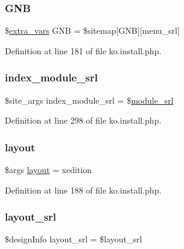 \subsubsection{\texorpdfstring{G\+NB}{GNB}}
{\footnotesize\ttfamily \$\hyperlink{ko_8install_8php_ae1dcb37fc34a8f312d2e6abd6f806743}{extra\+\_\+vars} G\+NB = \$sitemap\mbox{[}\textquotesingle{}G\+NB\textquotesingle{}\mbox{]}\mbox{[}\textquotesingle{}menu\+\_\+srl\textquotesingle{}\mbox{]}}



Definition at line 181 of file ko.\+install.\+php.

\hypertarget{ko_8install_8php_acd0b17bfe6d14c82871d73fa39c9c22d}{}\label{ko_8install_8php_acd0b17bfe6d14c82871d73fa39c9c22d} 
\subsubsection{\texorpdfstring{index\+\_\+module\+\_\+srl}{index\_module\_srl}}
{\footnotesize\ttfamily \$site\+\_\+args index\+\_\+module\+\_\+srl = \$\hyperlink{ko_8install_8php_a370bb6450fab1da3e0ed9f484a38b761}{module\+\_\+srl}}



Definition at line 298 of file ko.\+install.\+php.

\hypertarget{ko_8install_8php_a0dc2cdff7167f362443808ff71ae5177}{}\label{ko_8install_8php_a0dc2cdff7167f362443808ff71ae5177} 
\subsubsection{\texorpdfstring{layout}{layout}}
{\footnotesize\ttfamily \$args \hyperlink{classlayout}{layout} = \textquotesingle{}xedition\textquotesingle{}}



Definition at line 188 of file ko.\+install.\+php.

\hypertarget{ko_8install_8php_a70054876db09b2519a1726663c8dd9e7}{}\label{ko_8install_8php_a70054876db09b2519a1726663c8dd9e7} 
\subsubsection{\texorpdfstring{layout\+\_\+srl}{layout\_srl}}
{\footnotesize\ttfamily \$design\+Info layout\+\_\+srl = \$layout\+\_\+srl}




